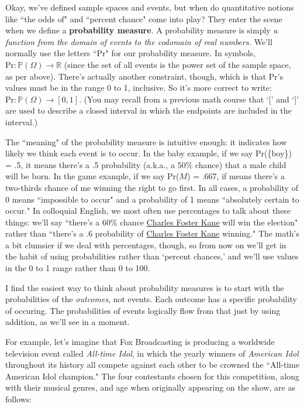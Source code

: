 
Okay, we've defined sample spaces and events, but when do quantitative
notions like ``the odds of" and ``percent chance" come into play? They
enter the scene when we define a \textbf{probability measure}. A
probability measure is simply \textit{a function from the domain of events
to the codomain of real numbers.} We'll normally use the letters ``Pr" for
our probability measure. In symbols, $\text{Pr}:\mathbb{P}(\Omega) \to
\mathbb{R}$ (since the set of all events is the power set of the sample
space, as per above). There's actually another constraint, though, which is
that Pr's values must be in the range 0 to 1, inclusive. So it's more
correct to write: $\text{Pr}:\mathbb{P}(\Omega)\to [0,1]$. (You may recall
from a previous math course that `[' and `]' are used to describe a closed
interval in which the endpoints are included in the interval.)

The ``meaning" of the probability measure is intuitive enough: it indicates
how likely we think each event is to occur. In the baby example, if we say
Pr(\{boy\}) = .5, it means there's a .5 probability (a.k.a., a 50\% chance)
that a male child will be born. In the game example, if we say Pr($M$) =
.667, if means there's a two-thirds chance of me winning the right to go
first. In all cases, a probability of 0 means ``impossible to occur" and a
probability of 1 means ``absolutely certain to occur." In colloquial
English, we most often use percentages to talk about these things: we'll
say ``there's a 60\% chance \href{https://en.wikipedia.org/wiki/Citizen_Kane}
{Charles Foster Kane} will win the election" rather than
``there's a .6 probability of \href{https://en.wikipedia.org/wiki/Charles_Foster_Kane}
{Charles Foster Kane} winning." The math's a bit clumsier
if we deal with percentages, though, so from now on we'll get in the
habit of using probabilities rather than `percent chances,' and we'll use
values in the 0 to 1 range rather than 0 to 100.

I find the easiest way to think about probability measures is to start with
the probabilities of the \textit{outcomes}, not events. Each outcome has a
specific probability of occuring. The probabilities of events logically
flow from that just by using addition, as we'll see in a moment. 

For example, let's imagine that Fox Broadcasting is producing a worldwide
television event called \textit{All-time Idol}, in which the yearly winners
of \textit{American Idol} throughout its history all compete against each
other to be crowned the ``All-time American Idol champion." The four
contestants chosen for this competition, along with their musical genres,
and age when originally appearing on the show, are as follows:

